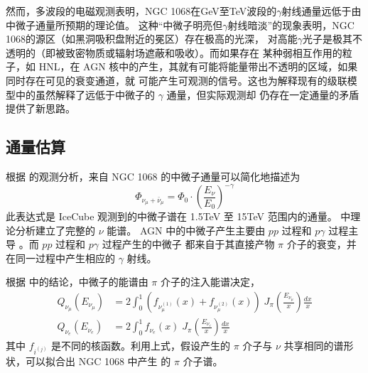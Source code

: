 \documentclass[UTF8]{ctexart}
\begin{document}
然而，多波段的电磁观测表明，NGC 1068在GeV至TeV波段的$\gamma$射线通量远低于由中微子通量所预期的理论值。
这种“中微子明亮但$\gamma$射线暗淡”的现象表明，NGC 1068的源区（如黑洞吸积盘附近的冕区）存在极高的光深，
对高能$\gamma$光子是极其不透明的（即被致密物质或辐射场遮蔽和吸收）\cite{murase2020hidden}。而如果存在
某种弱相互作用的粒子，如 HNL，在 AGN 核中的产生，其就有可能将能量带出不透明的区域，如果同时存在可见的衰变通道，就
可能产生可观测的信号。这也为解释现有的级联模型中的虽然解释了远低于中微子的 $\gamma$ 通量，但实际观测却
仍存在一定通量的矛盾提供了新思路。

\subsection{通量估算}

根据 \cite{icecube2022evidence} 的观测分析，来自 NGC 1068 的中微子通量可以简化地描述为
\begin{equation}
  \Phi_{\nu_\mu + \bar{\nu}_\mu} = \Phi_0 \cdot (\frac{E_\nu}{E_0})^{-\gamma} \label{eq:icecube_nuspec}
\end{equation}
此表达式是 IceCube 观测到的中微子谱在 1.5TeV 至 15TeV 范围内的通量。\cite{murase2020hidden} 中理论分析建立了完整的 $\nu$ 能谱。
AGN 中的中微子产生主要由 $pp$ 过程和 $p\gamma$ 过程主导 \cite{murase2020hidden}。而 $pp$ 过程和 $p\gamma$ 过程产生的中微子
都来自于其直接产物 $\pi$ 介子的衰变，并在同一过程中产生相应的 $\gamma$ 射线。

根据 \cite{kelner2006energy} 中的结论，中微子的能谱由 $\pi$ 介子的注入能谱决定，
\begin{align}
  Q_{\nu_\mu}(E_{\nu_\mu}) &= 2 \int_{0}^{1} (f_{\nu_\mu^{(1)}}(x) + f_{\nu_\mu^{(2)}}(x)) \; J_\pi\left(\frac{E_{\nu_\mu}}{x}\right) \frac{dx}{x} \\
  Q_{\nu_e}(E_{\nu_e}) &= 2 \int_{0}^{1} f_{\nu_e}(x) \; J_\pi\left(\frac{E_{\nu_e}}{x}\right) \frac{dx}{x}
\end{align}
其中 $f_{i^{(j)}}$ 是不同的核函数。利用上式，假设产生的 $\pi$ 介子与 $\nu$ 共享相同的谱形状，可以拟合出 NGC 1068 中产生
的 $\pi$ 介子谱。
\end{document}
